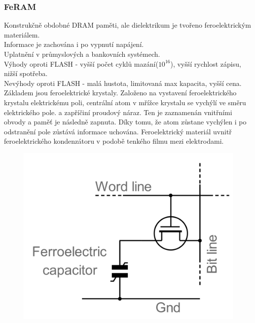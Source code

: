 \subsubsection*{FeRAM}
Konstrukčně obdobné DRAM paměti, ale dielektrikum je tvořeno feroelektrickým materiálem.\\
Informace je zachována i po vypnutí napájení.\\
Uplatnění v průmyslových a bankovních systémech.\\
Výhody oproti FLASH - vyšší počet cyklů mazání(\(10^{16}\)), vyšší rychlost zápisu, nižší spotřeba.\\
Nevýhody oproti FLASH - malá hustota, limitovaná max kapacita, vyšší cena.
Základem jsou feroelektrické krystaly. Založeno na vystavení feroelektrického krystalu elektrickému poli, centrální atom v mřížce krystalu se vychýlí ve směru elektrického pole. a zapříčiní proudový náraz. Ten je zaznamenán vnitřními obvody a paměť je následně zapnuta. Díky tomu, že atom zůstane vychýlen i po odstranění pole zůstává informace uchována.
Feroelektrický materiál uvnitř feroelektrického kondenzátoru v podobě tenkého filmu mezi elektrodami.
\begin{figure} [h!]
    \centering
    \includegraphics*[scale = 0.3]{img/FeRAM.png}
\end{figure}

